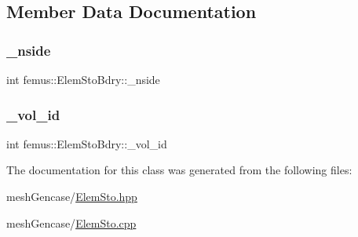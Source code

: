 \subsection{Member Data Documentation}
\mbox{\label{classfemus_1_1_elem_sto_bdry_a24ee13b2bdb33a0d2b03f7f820ad2d8b}} 
\subsubsection{\texorpdfstring{\+\_\+nside}{\_nside}}
{\footnotesize\ttfamily int femus\+::\+Elem\+Sto\+Bdry\+::\+\_\+nside}

\mbox{\label{classfemus_1_1_elem_sto_bdry_a5df83163da75a6633d69ba8bb19fced7}} 
\subsubsection{\texorpdfstring{\+\_\+vol\+\_\+id}{\_vol\_id}}
{\footnotesize\ttfamily int femus\+::\+Elem\+Sto\+Bdry\+::\+\_\+vol\+\_\+id}



The documentation for this class was generated from the following files\+:\begin{DoxyCompactItemize}
\item 
mesh\+Gencase/\mbox{\hyperlink{_elem_sto_8hpp}{Elem\+Sto.\+hpp}}\item 
mesh\+Gencase/\mbox{\hyperlink{_elem_sto_8cpp}{Elem\+Sto.\+cpp}}\end{DoxyCompactItemize}
